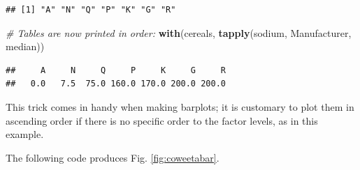 \documentclass[]{book}
\newenvironment{Shaded}{\begin{snugshade}}{\end{snugshade}}
\newcommand{\CommentTok}[1]{\textcolor[rgb]{0.56,0.35,0.01}{\textit{#1}}}
\newcommand{\DataTypeTok}[1]{\textcolor[rgb]{0.13,0.29,0.53}{#1}}
\newcommand{\KeywordTok}[1]{\textcolor[rgb]{0.13,0.29,0.53}{\textbf{#1}}}
\newcommand{\NormalTok}[1]{#1}
\newcommand{\OperatorTok}[1]{\textcolor[rgb]{0.81,0.36,0.00}{\textbf{#1}}}
\newcommand{\OtherTok}[1]{\textcolor[rgb]{0.56,0.35,0.01}{#1}}
\newcommand{\StringTok}[1]{\textcolor[rgb]{0.31,0.60,0.02}{#1}}
\begin{document}
\begin{Shaded}
\end{Shaded}

\begin{verbatim}
## [1] "A" "N" "Q" "P" "K" "G" "R"
\end{verbatim}

\begin{Shaded}
\begin{Highlighting}[]
\CommentTok{# Tables are now printed in order:}
\KeywordTok{with}\NormalTok{(cereals, }\KeywordTok{tapply}\NormalTok{(sodium, Manufacturer, median))}
\end{Highlighting}
\end{Shaded}

\begin{verbatim}
##     A     N     Q     P     K     G     R 
##   0.0   7.5  75.0 160.0 170.0 200.0 200.0
\end{verbatim}

This trick comes in handy when making barplots; it is customary to plot them in ascending order if there is no specific order to the factor levels, as in this example.

The following code produces Fig. \ref{fig:coweetabar}.
\end{document}
